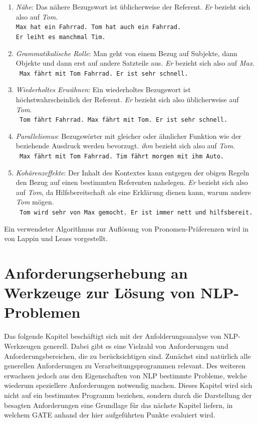 \documentclass[12pt]{report}
\begin{document}
\begin{enumerate}
\item \textit{Nähe}: Das nähere Bezugswort ist üblicherweise der Referent. \textit{\glqq  Er\grqq{}} bezieht sich also auf \textit{Tom}.\\
\tt Max hat ein Fahrrad. Tom hat auch ein Fahrrad. \\Er leiht es manchmal Tim.
\rm
\item \textit{Grammatikalische Rolle}: Man geht von einem Bezug auf Subjekte, dann Objekte und dann erst auf andere Satzteile aus. \textit{\glqq  Er\grqq{}} bezieht sich also auf \textit{Max}.\\
\tt
Max fährt mit Tom Fahrrad. Er ist sehr schnell.
\rm
\item \textit{Wiederholtes Erwähnen}: Ein wiederholtes Bezugswort ist höchstwahrscheinlich der Referent. \textit{\glqq  Er\grqq{}} bezieht sich also üblicherweise auf \textit{Tom}.\\
\tt
Tom fährt Fahrrad. Max fährt mit Tom. Er ist sehr schnell.
\rm
\item \textit{Parallelismus}: Bezugswörter mit gleicher oder ähnlicher Funktion wie der beziehende Ausdruck werden bevorzugt. \textit{\glqq  ihm\grqq{}} bezieht sich also auf \textit{Tom}. \\
\tt
Max fährt mit Tom Fahrrad. Tim fährt morgen mit ihm Auto.
\rm
\item \textit{Kohärenzeffekte}: Der Inhalt des Kontextes kann entgegen der obigen Regeln den Bezug auf einen bestimmten Referenten nahelegen. \textit{\glqq  Er\grqq{}} bezieht sich also auf \textit{Tom}, da Hilfsbereitschaft als eine Erklärung dienen kann, warum andere \textit{Tom} mögen.\\
\tt
Tom wird sehr von Max gemocht. Er ist immer nett und hilfsbereit.
\rm
\end{enumerate}
Ein verwendeter Algorithmus zur Auflösung von Pronomen-Präferenzen wird in \cite{ll94} von Lappin und Leass vorgestellt.\\

\chapter[Anforderungserhebung an NLP-Wekzeuge]{Anforderungserhebung an Werkzeuge zur Lösung von NLP-Problemen}
Das folgende Kapitel beschäftigt sich mit der Anfolderungsanalyse von NLP-Werkzeugen generell. Dabei gibt es eine Vielzahl von Anforderungen und Anforderungsbereichen, die zu berücksichtigen sind. Zunächst sind natürlich alle generellen Anforderungen zu Verarbeitungsprogrammen relevant. Des weiteren erwachsen jedoch aus den Eigenschaften von NLP bestimmte Probleme, welche wiederum speziellere Anforderungen notwendig machen. Dieses Kapitel wird sich nicht auf ein bestimmtes Programm beziehen, sondern durch die Darstellung der besagten Anforderungen eine Grundlage für das nächste Kapitel liefern, in welchem GATE anhand der hier aufgeführten Punkte evaluiert wird. 
\end{document}
